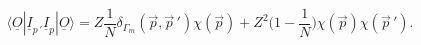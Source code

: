 \begin{equation}
\langle \underline{O}|\underline{I}_{p\,'}
\underline{I}_p|\underline{O}\rangle
=
Z\frac{1}{N}\delta_{\Gamma_m}(\vec p,\vec p\,')
\chi(\vec p)
+
Z^2\Big(1-\frac{1}{N}\Big)
\chi(\vec p)\chi(\vec p\,').\label{1/N'}
\end{equation}

